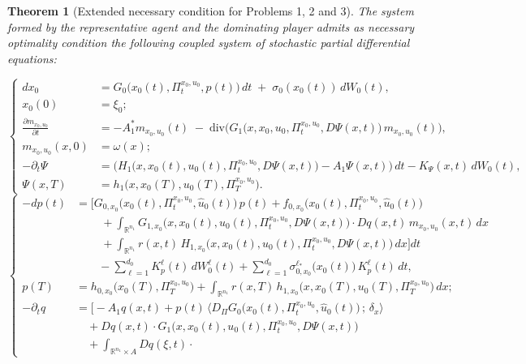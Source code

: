 \documentclass[12pt]{article}
\newtheorem{teo}{Theorem}[section]
\theoremstyle{definition}
\begin{document}
\begin{teo}[Extended necessary condition for Problems 1, 2 and 3]
\label{teo:CNO_extendida}
The system formed by the representative agent and the dominating player admits as necessary optimality condition the following coupled system of stochastic partial differential equations:

\[
\left\{
\begin{aligned}
    dx_0 &= G_0\big(x_0(t),\Pi^{x_0,u_0}_t, p(t)\big)\, dt \;+\; \sigma_0(x_0(t))\, dW_0(t), \\
    x_0(0)&=\xi_0;\\[0.5cm]
    \frac{\partial m_{x_0,u_0}}{\partial t} &= -A_1^* m_{x_0,u_0}(t)\;-\; \mathrm{div}\Big( G_1\big(x, x_0,u_0,\Pi^{x_0,u_0}_t, D\Psi(x,t)\big)\, m_{x_0,u_0}(t)\Big),\\
    m_{x_0,u_0}(x,0)&=\omega(x); \\[0.5cm]
    -\partial_t \Psi &= \Big( H_1\big(x, x_0(t),u_0(t),\Pi^{x_0,u_0}_t, D\Psi(x,t)\big) - A_1 \Psi(x,t) \Big)\,dt - K_\Psi(x,t)\, dW_0(t), \\
    \Psi(x,T) &= h_1\big(x, x_0(T),u_0(T),\Pi^{x_0,u_0}_T\big).
\end{aligned}
\right.
\]
\[
\left\{
\begin{aligned}
    -dp(t)&=\bigg[
    G_{0,x_0}\!\big(x_0(t),\Pi^{x_0,u_0}_t,\hat u_0(t)\big)\,p(t)
    +f_{0,x_0}\!\big(x_0(t),\Pi^{x_0,u_0}_t,\hat u_0(t)\big) \\
    &\qquad\ +\int_{\mathbb{R}^{n_1}} \! G_{1,x_0}\!\big(x,x_0(t),u_0(t),\Pi^{x_0,u_0}_t,D\Psi(x,t)\big)\cdot Dq(x,t)\, m_{x_0,u_0}(x,t)\,dx \\
    &\qquad\ +\int_{\mathbb{R}^{n_1}} \! r(x,t)\, H_{1,x_0}\!\big(x,x_0(t),u_0(t),\Pi^{x_0,u_0}_t,D\Psi(x,t)\big)\,dx
    \bigg]dt \\
    &\qquad -\sum_{\ell=1}^{d_0} K_p^\ell(t)\,dW_0^\ell(t)
    +\sum_{\ell=1}^{d_0}\sigma^{\ell_*}_{0,x_0}\!\big(x_0(t)\big)\,K_p^\ell(t)\,dt, \\[0.3em]
    p(T)&=h_{0,x_0}\!\big(x_0(T),\Pi^{x_0,u_0}_T\big)+\int_{\mathbb{R}^{n_1}} r(x,T)\,h_{1,x_0}\!\big(x,x_0(T),u_0(T),\Pi^{x_0,u_0}_T\big)\,dx; \\[0.5cm]
    -\partial_t q&=\Big[-A_1 q(x,t)
    +p(t)\,\Big\langle D_{\Pi}G_0\!\big(x_0(t),\Pi^{x_0,u_0}_t,\hat u_0(t)\big)\,;\,\delta_x\Big\rangle \\
    &\quad +Dq(x,t)\cdot G_1\!\big(x,x_0(t),u_0(t),\Pi^{x_0,u_0}_t,D\Psi(x,t)\big) \\
    &\quad +\int_{\mathbb{R}^{n_1}\times A} Dq(\xi,t)\cdot

\end{aligned}\]
\end{teo}
\end{document}
